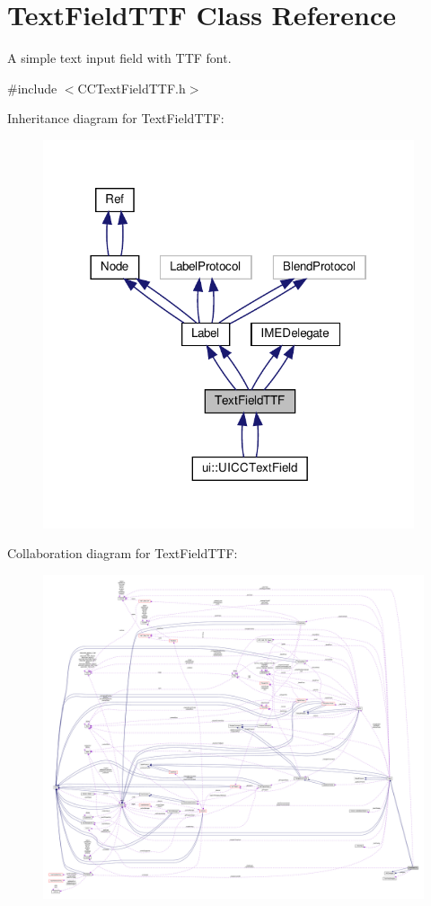 \hypertarget{classTextFieldTTF}{}\section{Text\+Field\+T\+TF Class Reference}
\label{classTextFieldTTF}


A simple text input field with T\+TF font.  




{\ttfamily \#include $<$C\+C\+Text\+Field\+T\+T\+F.\+h$>$}



Inheritance diagram for Text\+Field\+T\+TF\+:
\nopagebreak
\begin{figure}[H]
\begin{center}
\leavevmode
\includegraphics[width=310pt]{classTextFieldTTF__inherit__graph}
\end{center}
\end{figure}


Collaboration diagram for Text\+Field\+T\+TF\+:
\nopagebreak
\begin{figure}[H]
\begin{center}
\leavevmode
\includegraphics[width=350pt]{classTextFieldTTF__coll__graph}
\end{center}
\end{figure}

